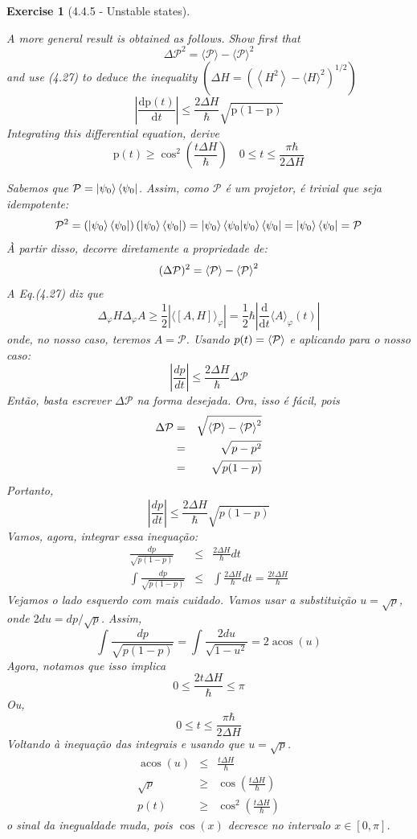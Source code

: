 \documentclass[12pt]{article}
\def\be{\begin{equation}}
\def\ee{\end{equation}}
\def\bea{\begin{eqnarray*}}
\def\eea{\end{eqnarray*}}
\def\f{\frac}
\def\l{\left}
\def\r{\right}
\newtheorem{exercise}{Exercise}
\DeclareMathOperator{\acos}{acos}
\begin{document}
\begin{exercise}[4.4.5 - Unstable states]
\begin{exercises}
			\item A more general result is obtained as follows. Show first that
			$$
			\Delta \mathcal{P}^{2}=\langle\mathcal{P}\rangle-\langle\mathcal{P}\rangle^{2}
			$$
			and use (4.27) to deduce the inequality $\left(\Delta H=\left(\left\langle H^{2}\right\rangle-\langle H\rangle^{2}\right)^{1 / 2}\right)$
			$$
			\left|\frac{\mathrm{d} \mathrm{p}(t)}{\mathrm{d} t}\right| \leq \frac{2 \Delta H}{\hbar} \sqrt{\mathrm{p}(1-\mathrm{p})}
			$$
			Integrating this differential equation, derive
			$$
			\mathrm{p}(t) \geq \cos ^{2}\left(\frac{t \Delta H}{\hbar}\right) \quad 0 \leq t \leq \frac{\pi \hbar}{2 \Delta H}
			$$		
			\begin{multianswer}
				Sabemos que $\mathcal{P} = \ket{\psi_0}\bra{\psi_0}$. Assim, como $\mathcal{P}$ é um projetor, é trivial que seja idempotente:
				\be
					\mathcal{P}^2 = \l(\ket{\psi_0}\bra{\psi_0}\r)\l(\ket{\psi_0}\bra{\psi_0}\r) = \ket{\psi_0}\braket{\psi_0|\psi_0}\bra{\psi_0} = \ket{\psi_0}\bra{\psi_0} = \mathcal{P}
				\ee
				À partir disso, decorre diretamente a propriedade de:
				\be
					(\Delta\mathcal{P})^2 = \braket{\mathcal{P}} - \braket{\mathcal{P}}^2
				\ee
				A Eq.(4.27) diz que
				\be
					\Delta_{\varphi} H \Delta_{\varphi} A \geq \frac{1}{2}\left|\langle[A, H]\rangle_{\varphi}\right|=\frac{1}{2} \hbar\left|\frac{\mathrm{d}}{\mathrm{d} t}\langle A\rangle_{\varphi}(t)\right|
				\ee
				onde, no nosso caso, teremos $A=\mathcal{P}$. Usando $p(t)=\braket{\mathcal{P}}$ e aplicando para o nosso caso:
				\be
					\l|\f{dp}{dt}\r| \leq \f{2\Delta H}{\hbar}\Delta\mathcal{P} 
				\ee
				Então, basta escrever $\Delta\mathcal{P}$ na forma desejada. Ora, isso é fácil, pois
				\bea
					\Delta\mathcal{P} &=& \sqrt{\braket{\mathcal{P}} - \braket{\mathcal{P}}^2} \\
							&=& \sqrt{p - p^2} \\
							&=& \sqrt{p(1-p)}
				\eea
				Portanto, 
				\be
					\l|\f{dp}{dt}\r| \leq \f{2\Delta H}{\hbar}\sqrt{p(1-p)} 
				\ee
				Vamos, agora, integrar essa inequação:
				\bea
					\f{dp}{\sqrt{p(1-p)}} &\leq& \f{2\Delta H}{\hbar} dt  \\
					\int \f{dp}{\sqrt{p(1-p)}} &\leq& \int \f{2\Delta H}{\hbar} dt = \f{2t\Delta H}{\hbar}
				\eea
				Vejamos o lado esquerdo com mais cuidado. Vamos usar a substituição $u=\sqrt{p}$, onde $2du = dp/\sqrt{p}$. Assim, 
				\be
					\int \f{dp}{\sqrt{p(1-p)}} = \int \f{2du}{\sqrt{1-u^2}} = 2\acos(u)
				\ee
				Agora, notamos que isso implica
				\be
					0 \leq \f{2t\Delta H}{\hbar} \leq \pi
				\ee
				Ou,
				\be
					0 \leq t \leq \frac{\pi \hbar}{2 \Delta H}
				\ee
				Voltando à inequação das integrais e usando que $u=\sqrt{p}$. 
				\bea
					\acos(u) &\leq& \f{t\Delta H}{\hbar} \\ 
					\sqrt{p} &\geq& \cos\l(\f{t\Delta H}{\hbar}\r)  \\
					p(t) &\geq& \cos^2\l(\f{t\Delta H}{\hbar}\r) 
				\eea
				o sinal da inegualdade muda, pois $\cos(x)$ decresce no intervalo $x\in[0, \pi]$. 	
			\end{multianswer}
		

\end{exercises}
\end{exercise}
\end{document}
